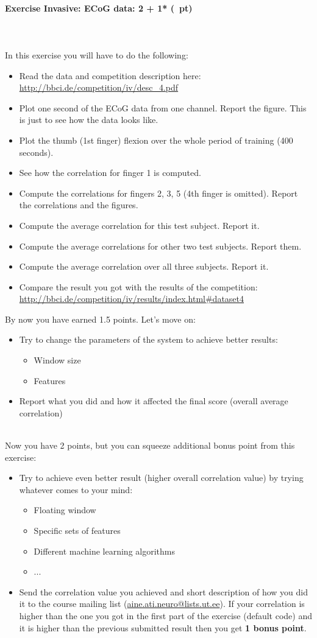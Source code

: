 \documentclass[a4paper,11pt]{article}
\newenvironment{exercise}[3]{\paragraph{Exercise #1: #2 (#3pt)}\ \\}{
\medskip}
\begin{document}
\begin{exercise}{2}{Invasive: ECoG data}{2 + 1* }
\ \\
In this exercise you will have to do the following:
\begin{itemize}
\itemsep 0em
	\item Read the data and competition description here: \url{http://bbci.de/competition/iv/desc_4.pdf}
	\item Plot one second of the ECoG data from one channel. Report the figure. This is just to see how the data looks like.
	\item Plot the thumb (1st finger) flexion over the whole period of training (400 seconds).
	\item See how the correlation for finger 1 is computed.
	\item Compute the correlations for fingers 2, 3, 5 (4th finger is omitted). Report the correlations and the figures.
	\item Compute the average correlation for this test subject. Report it.
	\item Compute the average correlations for other two test subjects. Report them.
	\item Compute the average correlation over all three subjects. Report it.
	\item Compare the result you got with the results of the competition: \url{http://bbci.de/competition/iv/results/index.html#dataset4}
\end{itemize}
By now you have earned 1.5 points. Let's move on:
\begin{itemize}
\itemsep 0em
	\item Try to change the parameters of the system to achieve better results:
	\begin{itemize}
		\item Window size
		\item Features
	\end{itemize}
	\item Report what you did and how it affected the final score (overall average correlation)
\end{itemize}
\ \\
Now you have 2 points, but you can squeeze additional bonus point from this exercise:
\begin{itemize}
	\item Try to achieve even better result (higher overall correlation value) by trying whatever comes to your mind:
	\begin{itemize}
		\item Floating window
		\item Specific sets of features
		\item Different machine learning algorithms
		\item ...
	\end{itemize}
	\item Send the correlation value you achieved and short description of how you did it to the course mailing list (\url{aine.ati.neuro@lists.ut.ee}). If your correlation is higher than the one you got in the first part of the exercise (default code) and it is higher than the previous submitted result then you get \textbf{1 bonus point}.
\end{itemize}


\end{exercise}
\end{document}
